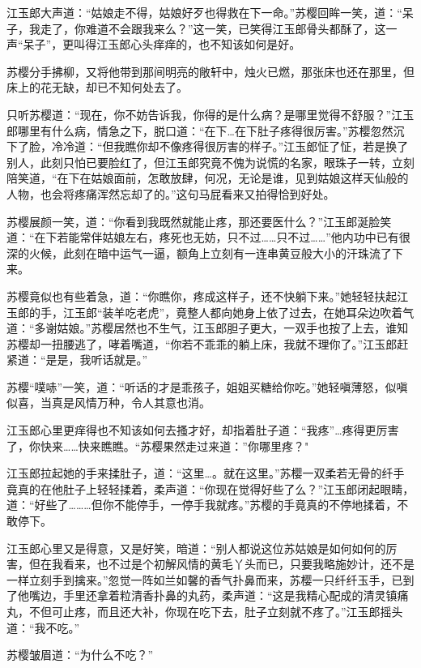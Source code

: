 \documentclass[12pt,oneside]{book}
\begin{document}
江玉郎大声道：``姑娘走不得，姑娘好歹也得救在下一命。''苏樱回眸一笑，道：``呆子，我走了，你难道不会跟我来么？''这一笑，已笑得江玉郎骨头都酥了，这一声``呆子''，更叫得江玉郎心头痒痒的，也不知该如何是好。

苏樱分手拂柳，又将他带到那间明亮的敞轩中，烛火已燃，那张床也还在那里，但床上的花无缺，却已不知何处去了。

只听苏樱道：``现在，你不妨告诉我，你得的是什么病？是哪里觉得不舒服？''江玉郎哪里有什么病，情急之下，脱口道：``在下\ldots 在下肚子疼得很厉害。''苏樱忽然沉下了脸，冷冷道：``但我瞧你却不像疼得很厉害的样子。''江玉郎怔了怔，若是换了别人，此刻只怕已要脸红了，但江玉郎究竟不傀为说慌的名家，眼珠子一转，立刻陪笑道，``在下在姑娘面前，怎敢放肆，何况，无论是谁，见到姑娘这样天仙般的人物，也会将疼痛浑然忘却了的。''这句马屁看来又拍得恰到好处。

苏樱展颜一笑，道：``你看到我既然就能止疼，那还要医什么？''江玉郎涎脸笑道：``在下若能常伴姑娘左右，疼死也无妨，只不过\ldots\ldots 只不过\ldots\ldots{}''他内功中已有很深的火候，此刻在暗中运气一逼，额角上立刻有一连串黄豆般大小的汗珠流了下来。

苏樱竟似也有些着急，道：``你瞧你，疼成这样子，还不快躺下来。''她轻轻扶起江玉郎的手，江玉郎``装羊吃老虎''，竟整人都向她身上依了过去，在她耳朵边吹着气道：``多谢姑娘。''苏樱居然也不生气，江玉郎胆子更大，一双手也按了上去，谁知苏樱却一扭腰逃了，哮着嘴道，``你若不乖乖的躺上床，我就不理你了。''江玉郎赶紧道：``是是，我听话就是。''

苏樱``噗哧''一笑，道：``听话的才是乖孩子，姐姐买糖给你吃。''她轻嗔薄怒，似嗔似喜，当真是风情万种，令人其意也消。

江玉郎心里更痒得也不知该如何去搔才好，却指着肚子道：``我疼''\ldots 疼得更厉害了，你快来\ldots\ldots 快来瞧瞧。``苏樱果然走过来道：''你哪里疼？"

江玉郎拉起她的手来揉肚子，道：``这里\ldots。就在这里。''苏樱一双柔若无骨的纤手竟真的在他肚子上轻轻揉着，柔声道：``你现在觉得好些了么？''江玉郎闭起眼睛，道：``好些了\ldots\ldots\ldots 但你不能停手，一停手我就疼。''苏樱的手竟真的不停地揉着，不敢停下。

江玉郎心里又是得意，又是好笑，暗道：``别人都说这位苏姑娘是如何如何的厉害，但在我看来，也不过是个初解风情的黄毛丫头而已，只要我略施妙计，还不是一样立刻手到擒来。''忽觉一阵如兰如馨的香气扑鼻而来，苏樱一只纤纤玉手，已到了他嘴边，手里还拿着粒清香扑鼻的丸药，柔声道：``这是我精心配成的清灵镇痛丸，不但可止疼，而且还大补，你现在吃下去，肚子立刻就不疼了。''江玉郎摇头道：``我不吃。''

苏樱皱眉道：``为什么不吃？''
\end{document}
